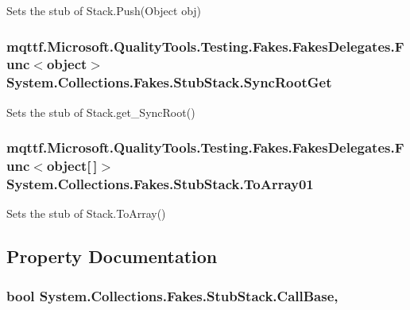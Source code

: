 Sets the stub of Stack.\-Push(\-Object obj)

\hypertarget{class_system_1_1_collections_1_1_fakes_1_1_stub_stack_af4d10b13d7049ff72a5dc292c3f8bb1f}{
\subsubsection[{Sync\-Root\-Get}]{\setlength{\rightskip}{0pt plus 5cm}mqttf.\-Microsoft.\-Quality\-Tools.\-Testing.\-Fakes.\-Fakes\-Delegates.\-Func$<$object$>$ System.\-Collections.\-Fakes.\-Stub\-Stack.\-Sync\-Root\-Get}}\label{class_system_1_1_collections_1_1_fakes_1_1_stub_stack_af4d10b13d7049ff72a5dc292c3f8bb1f}


Sets the stub of Stack.\-get\-\_\-\-Sync\-Root()

\hypertarget{class_system_1_1_collections_1_1_fakes_1_1_stub_stack_aa2effab4f696d814f50a5c486bc6d05c}{
\subsubsection[{To\-Array01}]{\setlength{\rightskip}{0pt plus 5cm}mqttf.\-Microsoft.\-Quality\-Tools.\-Testing.\-Fakes.\-Fakes\-Delegates.\-Func$<$object\mbox{[}$\,$\mbox{]}$>$ System.\-Collections.\-Fakes.\-Stub\-Stack.\-To\-Array01}}\label{class_system_1_1_collections_1_1_fakes_1_1_stub_stack_aa2effab4f696d814f50a5c486bc6d05c}


Sets the stub of Stack.\-To\-Array()



\subsection{Property Documentation}
\hypertarget{class_system_1_1_collections_1_1_fakes_1_1_stub_stack_a6168e2a58d36ffe157975e02aedf7a15}{
\subsubsection[{Call\-Base}]{\setlength{\rightskip}{0pt plus 5cm}bool System.\-Collections.\-Fakes.\-Stub\-Stack.\-Call\-Base\hspace{0.3cm}{\ttfamily [get]}, {\ttfamily [set]}}}\label{class_system_1_1_collections_1_1_fakes_1_1_stub_stack_a6168e2a58d36ffe157975e02aedf7a15}


